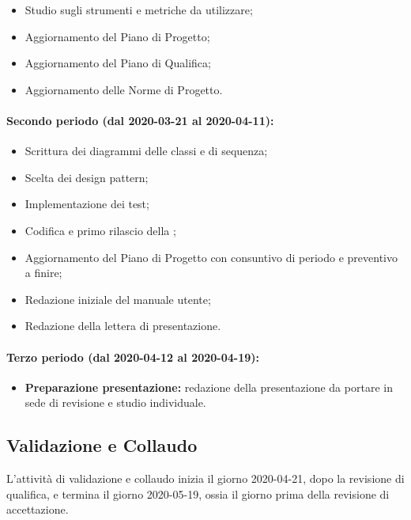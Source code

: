 					\begin{itemize}
						\item Studio sugli strumenti e metriche da utilizzare;
					 	\item Aggiornamento del Piano di Progetto;
					 	\item Aggiornamento del Piano di Qualifica;
					 	\item Aggiornamento delle Norme di Progetto.
					\end{itemize} 	
				
				\paragraph{Secondo periodo (dal 2020-03-21 al 2020-04-11):}
				
					\begin{itemize}
						\item Scrittura dei diagrammi delle classi e di sequenza;
						\item Scelta dei design pattern;
						\item Implementazione dei test;
						\item Codifica e primo rilascio della ;
						\item Aggiornamento del Piano di Progetto con consuntivo di periodo e preventivo a finire;
						\item Redazione iniziale del manuale utente;
						\item Redazione della lettera di presentazione.
					\end{itemize}
		
				\paragraph{Terzo periodo (dal 2020-04-12 al 2020-04-19):}
				
					\begin{itemize}
						\item \textbf{Preparazione presentazione:} redazione della presentazione da portare in sede di revisione e studio individuale.
					\end{itemize}
		
		\subsection{Validazione e Collaudo}	
			
			L'attività di validazione e collaudo inizia il giorno 2020-04-21, dopo la revisione di qualifica, e termina il giorno 2020-05-19, ossia il giorno prima della revisione di accettazione.
			
